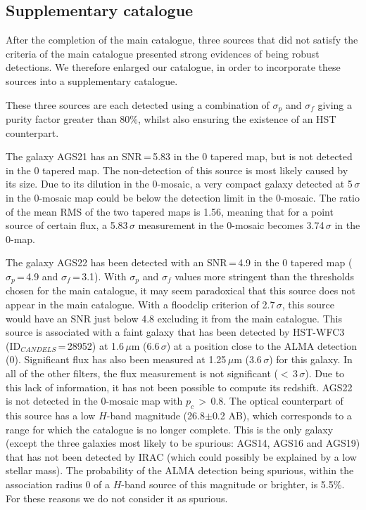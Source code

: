 \documentclass[longauth]{aa}
\begin{document}
\begin{table*}
\label{table_offset}  
\end{table*}

\subsection{Supplementary catalogue}\label{sec:Add-on_catalogue}

After the completion of the main catalogue, three sources that did not satisfy the criteria of the main catalogue presented strong evidences of being robust detections. We therefore enlarged our catalogue, in order to incorporate these sources into a supplementary catalogue.

These three sources are each detected using a combination of $\sigma_p$ and $\sigma_f$ giving a purity factor greater than 80\%, whilst also ensuring the existence of an HST counterpart.

The galaxy AGS21 has an SNR\,=\,5.83 in the 0 tapered map, but is not detected in the 0 tapered map. The non-detection of this source is most likely caused by its size. Due to its dilution in the 0-mosaic, a very compact galaxy detected at 5\,$\sigma$ in the 0-mosaic map could be below the detection limit in the 0-mosaic. The ratio of the mean RMS of the two tapered maps is 1.56, meaning that for a point source of certain flux, a 5.83\,$\sigma$ measurement in the 0-mosaic becomes 3.74$\,\sigma$ in the 0-map.

The galaxy AGS22 has been detected with an SNR\,=\,4.9 in the 0 tapered map ($\sigma_p$\,=\,4.9 and $\sigma_f$\,=\,3.1). With $\sigma_p$ and $\sigma_f$ values more stringent than the thresholds chosen for the main catalogue, it may seem paradoxical that this source does not appear in the main catalogue. With a floodclip criterion of 2.7\,$\sigma$, this source would have an SNR just below 4.8 excluding it from the main catalogue. This source is associated with a faint galaxy that has been detected by HST-WFC3 (ID$_{CANDELS}$\,=\,28952) at 1.6\,$\mu$m (6.6\,$\sigma$) at a position close to the ALMA detection (0). Significant flux has also been measured at 1.25\,$\mu$m (3.6\,$\sigma$) for this galaxy. In all of the other filters, the flux measurement is not significant ($<$\,3\,$\sigma$). Due to this lack of information, it has not been possible to compute its redshift. AGS22 is not detected in the 0-mosaic map with $p_c$\,$>$\,0.8. The optical counterpart of this source has a low $H$-band magnitude (26.8$\pm$0.2 AB), which corresponds to a range for which the \cite{Guo2013} catalogue is no longer complete. This is the only galaxy (except the three galaxies most likely to be spurious: AGS14, AGS16 and AGS19) that has not been detected by IRAC (which could possibly be explained by a low stellar mass). The probability of the ALMA detection being spurious, within the association radius 0 of a $H$-band source of this magnitude or brighter, is 5.5\%. For these reasons we do not consider it as spurious.
\end{document}
